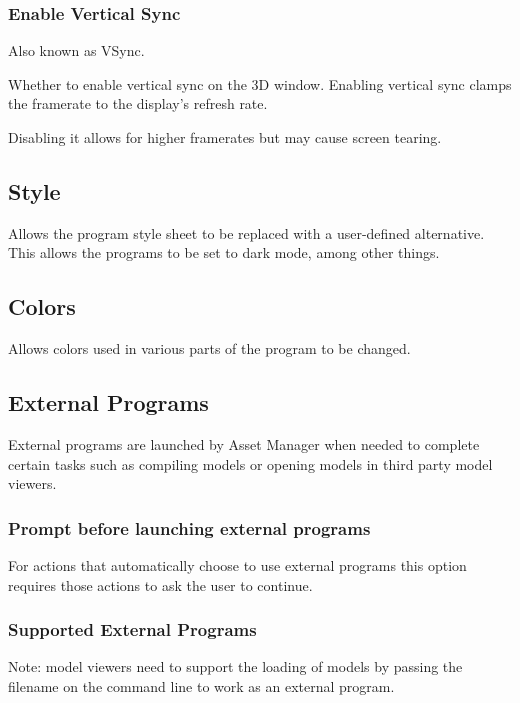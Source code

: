 \documentclass[10pt, a4paper, titlepage, oneside]{article}
\begin{document}
\subsubsection{Enable Vertical Sync}

Also known as VSync.

Whether to enable vertical sync on the 3D window. Enabling vertical sync clamps the framerate to the display's refresh rate.

Disabling it allows for higher framerates but may cause screen tearing.

\subsection{Style}

Allows the program style sheet to be replaced with a user-defined alternative. This allows the programs to be set to dark mode, among other things.

\subsection{Colors}

Allows colors used in various parts of the program to be changed.

\newpage

\subsection{External Programs}

External programs are launched by Asset Manager when needed to complete certain tasks such as compiling models or opening models in third party model viewers.

\subsubsection{Prompt before launching external programs}

For actions that automatically choose to use external programs this option requires those actions to ask the user to continue.

\subsubsection{Supported External Programs}
\label{sec:external_programs}

Note: model viewers need to support the loading of models by passing the filename on the command line to work as an external program.
\end{document}
